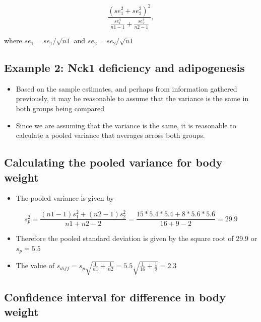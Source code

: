\documentclass[
]{book}
\providecommand{\tightlist}{%
  \setlength{\itemsep}{0pt}\setlength{\parskip}{0pt}}
\begin{document}
\[\frac{(se_1^2+se_2^2)^2}{\frac{se_1^4}{n1-1}+\frac{se_2^4}{n2-1}},\]

where \(se_1 = se_1/\sqrt{n1}\) and \(se_2 = se_2/\sqrt{n1}\)

\hypertarget{example-2-nck1-deficiency-and-adipogenesis-1}{%
\subsection{Example 2: Nck1 deficiency and adipogenesis}\label{example-2-nck1-deficiency-and-adipogenesis-1}}

\begin{itemize}
\tightlist
\item
  Based on the sample estimates, and perhaps from information gathered previously, it may be reasonable to assume that the variance is the same in both groups being compared
\item
  Since we are assuming that the variance is the same, it is reasonable to calculate a pooled variance that averages across both groups.
\end{itemize}

\hypertarget{calculating-the-pooled-variance-for-body-weight}{%
\subsection{Calculating the pooled variance for body weight}\label{calculating-the-pooled-variance-for-body-weight}}

\begin{itemize}
\tightlist
\item
  The pooled variance is given by
\end{itemize}

\[s_p^2=\frac{(n1-1)s_1^2+(n2-1)s_2^2}{n1+n2-2}=\frac{15*5.4*5.4+8*5.6*5.6}{16+9-2}=29.9\]

\begin{itemize}
\tightlist
\item
  Therefore the pooled standard deviation is given by the square root of 29.9 or \(s_p=5.5\)
\item
  The value of \(s_{diff}=s_p\sqrt{\frac{1}{n1}+\frac{1}{n2}}=5.5\sqrt{\frac{1}{16}+\frac{1}{9}}=2.3\)
\end{itemize}

\hypertarget{confidence-interval-for-difference-in-body-weight}{%
\subsection{Confidence interval for difference in body weight}\label{confidence-interval-for-difference-in-body-weight}}
\end{document}
